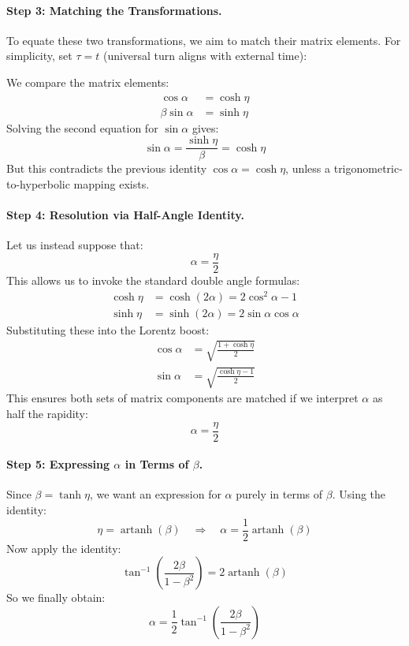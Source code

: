 \documentclass{article}
\DeclareMathOperator{\artanh}{artanh}
\begin{document}
\paragraph{Step 3: Matching the Transformations.} To equate these two transformations, we aim to match their matrix elements. For simplicity, set $\tau = t$ (universal turn aligns with external time):

We compare the matrix elements:
\begin{align}
\cos\alpha &= \cosh\eta \\
\beta\sin\alpha &= \sinh\eta
\end{align}
Solving the second equation for $\sin\alpha$ gives:
\begin{equation}
\sin\alpha = \frac{\sinh\eta}{\beta} = \cosh\eta
\end{equation}
But this contradicts the previous identity $\cos\alpha = \cosh\eta$, unless a trigonometric-to-hyperbolic mapping exists.

\paragraph{Step 4: Resolution via Half-Angle Identity.} Let us instead suppose that:
\begin{equation}
\alpha = \frac{\eta}{2}
\end{equation}
This allows us to invoke the standard double angle formulas:
\begin{align}
\cosh\eta &= \cosh(2\alpha) = 2\cos^2\alpha - 1 \\
\sinh\eta &= \sinh(2\alpha) = 2\sin\alpha\cos\alpha
\end{align}
Substituting these into the Lorentz boost:
\begin{align}
\cos\alpha &= \sqrt{\frac{1+\cosh\eta}{2}} \\
\sin\alpha &= \sqrt{\frac{\cosh\eta - 1}{2}}
\end{align}
This ensures both sets of matrix components are matched if we interpret $\alpha$ as half the rapidity:
\begin{equation}
\boxed{\alpha = \frac{\eta}{2}}
\end{equation}

\paragraph{Step 5: Expressing $\alpha$ in Terms of $\beta$.} Since $\beta = \tanh\eta$, we want an expression for $\alpha$ purely in terms of $\beta$. Using the identity:
\begin{equation}
\eta = \artanh(\beta)
\quad \Rightarrow \quad
\alpha = \frac{1}{2}\artanh(\beta)
\end{equation}
Now apply the identity:
\begin{equation}
\tan^{-1}\left(\frac{2\beta}{1 - \beta^2}\right) = 2\artanh(\beta)
\end{equation}
So we finally obtain:
\begin{equation}
\boxed{\alpha = \frac{1}{2}\tan^{-1}\left(\frac{2\beta}{1 - \beta^2}\right)}
\end{equation}
\end{document}
